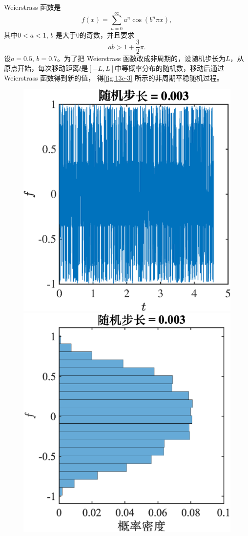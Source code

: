 \documentclass[12pt]{ctexart}
\begin{document}
Weierstrass 函数是
\begin{equation}
	f(x)=\sum_{n=0} ^\infty a^n \cos(b^n \pi x),
\end{equation}
其中$0<a<1$, $b$ 是大于$0$的奇数，并且要求
\begin{equation}
	ab>1+\frac{3}{2}\pi.
\end{equation}
设$a=0.5,\, b=0.7$。为了把 Weierstrass 函数改成非周期的，设随机步长为$L$，从原点开始，每次移动距离$l$是$[-L,L]$中等概率分布的随机数，移动后通过 Weierstrass 函数得到新的值， 得\cref{fig:13e-3} 所示的非周期平稳随机过程。
\begin{figure}[htp]
	\centering
	\includegraphics[scale=0.33]{f3e-3L.eps}
	\hspace{0.5in}
	\includegraphics[scale=0.33]{p3e-3L.eps}

\end{figure}
\end{document}
